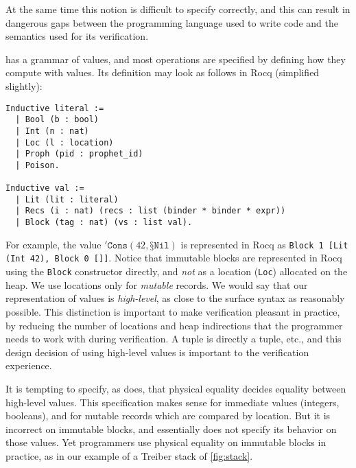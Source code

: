At the same time this notion is difficult to specify correctly, and this can result in dangerous gaps between the programming language used to write code and the semantics used for its verification.

\ZooLang has a grammar of values, and most operations are specified by defining how they compute with \ZooLang values. Its definition may look as follows in Rocq (simplified slightly):
\begin{verbatim}
Inductive literal :=
  | Bool (b : bool)
  | Int (n : nat)
  | Loc (l : location)
  | Proph (pid : prophet_id)
  | Poison.

Inductive val :=
  | Lit (lit : literal)
  | Recs (i : nat) (recs : list (binder * binder * expr))
  | Block (tag : nat) (vs : list val).
\end{verbatim}

For example, the value $'\texttt{Cons} (42, \texttt{§}\texttt{Nil})$ is represented in Rocq as \texttt{Block 1 [Lit (Int 42), Block 0 []]}. Notice that immutable blocks are represented in Rocq using the \texttt{Block} constructor directly, and \emph{not} as a location (\texttt{Loc}) allocated on the heap. We use locations only for \emph{mutable} records. We would say that our representation of \ZooLang values is \emph{high-level}, as close to the surface syntax as reasonably possible. This distinction is important to make verification pleasant in practice, by reducing the number of locations and heap indirections that the programmer needs to work with during verification. A \ZooLang tuple is directly a tuple, etc., and this design decision of using high-level values is important to the verification experience.

It is tempting to specify, as \HeapLang does, that physical equality decides equality between high-level values. This specification makes sense for immediate values (integers, booleans), and for mutable records which are compared by location. But it is incorrect on immutable blocks, and \HeapLang essentially does not specify its behavior on those values. Yet programmers use physical equality on immutable blocks in practice, as in our example of a Treiber stack of \cref{fig:stack}.

